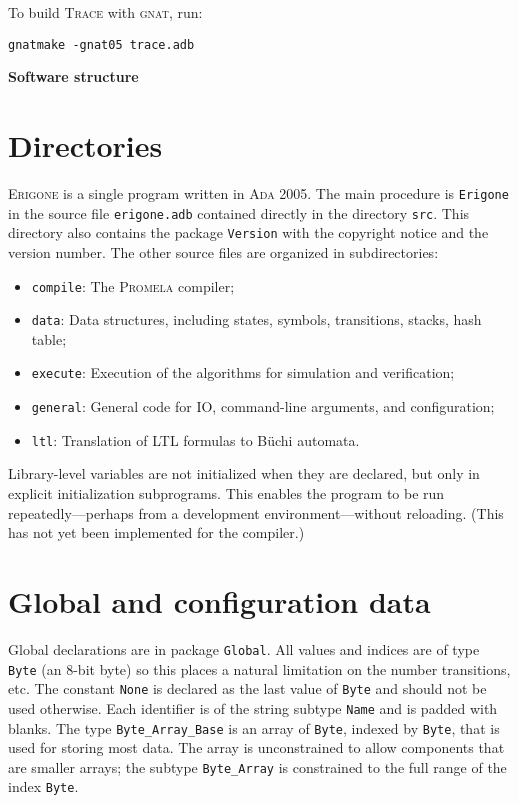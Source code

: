 \documentclass[11pt]{article}
\newcommand*{\prg}{\textsc{Erigone}}
\newcommand*{\trc}{\textsc{Trace}}
\newcommand*{\prm}{\textsc{Promela}}
\newcommand*{\ada}{\textsc{Ada 2005}}
\newcommand*{\gnat}{\textsc{gnat}}
\newcommand*{\p}[1]{\texttt{#1}}
\begin{document}
To build \trc{} with \gnat{}, run:
\begin{verbatim}
gnatmake -gnat05 trace.adb
\end{verbatim}

\newpage

\begin{center}
\textbf{\Large Software structure}
\end{center}

\setcounter{section}{0}

\section{Directories}
\prg{} is a single program written in \ada{}. The main procedure is
\p{Erigone} in the source file \p{erigone.adb} contained directly in the
directory \p{src}. This directory also contains the package \p{Version} with
the copyright notice and the version number. The other source files are
organized in subdirectories:
\begin{itemize}
\item \p{compile}: The \prm{} compiler;
\item \p{data}: Data structures, including states, symbols, transitions, stacks, hash
table;
\item \p{execute}: Execution of the algorithms for simulation and
verification;
\item \p{general}: General code for IO, command-line arguments,
and configuration;
\item \p{ltl}: Translation of LTL formulas to B\"{u}chi automata.
\end{itemize}

Library-level variables are not initialized when they are declared, but
only in explicit initialization subprograms. This enables the program
to be run repeatedly---perhaps from a development environment---without
reloading. (This has not yet been implemented for the compiler.)

\section{Global and configuration data}

Global declarations are in package \p{Global}. All values and indices
are of type \p{Byte} (an 8-bit byte) so this places a natural limitation
on the number transitions, etc. The constant \p{None} is declared as the
last value of \p{Byte} and should not be used otherwise. Each identifier
is of the string subtype \p{Name} and is padded with blanks. The type
\p{Byte\_Array\_Base} is an array of \p{Byte}, indexed by \p{Byte}, that
is used for storing most data. The array is unconstrained to allow
components that are smaller arrays; the subtype \p{Byte\_Array} is
constrained to the full range of the index \p{Byte}.
\end{document}
